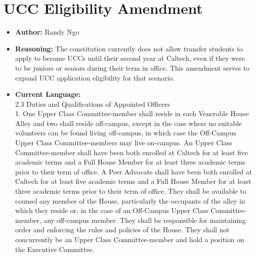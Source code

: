 \documentclass[10pt]{article} %
\begin{document}
\section{UCC Eligibility Amendment}
\begin{itemize}
    \item \textbf{Author:} Randy Ngo
    \item \textbf{Reasoning:} The constitution currently does not allow transfer students to apply to become UCCs until their second year at Caltech, even if they were to be juniors or seniors during their term in office. This amendment serves to expand UCC application eligibility for that scenario.
    
    \item \textbf{Current Language:} \\
        2.3 Duties and Qualifications of Appointed Officers \\
        1. One Upper Class Committee-member shall reside in each Venerable House Alley and two shall reside off-campus, except in the case where no suitable volunteers can be found living off-campus, in which case the Off-Campus Upper Class Committee-members may live on-campus. An Upper Class Committee-member shall have been both enrolled at Caltech for at least five academic terms and a Full House Member for at least three academic terms prior to their term of office. A Peer Advocate shall have been both enrolled at Caltech for at least five academic terms and a Full House Member for at least three academic terms prior to their term of office. They shall be available to counsel any member of the House, particularly the occupants of the alley in which they reside or, in the case of an Off-Campus Upper Class Committee-member, any off-campus member. They shall be responsible for maintaining order and enforcing the rules and policies of the House. They shall not concurrently be an Upper Class Committee-member and hold a position on the Executive Committee.


\end{itemize}
\end{document}
